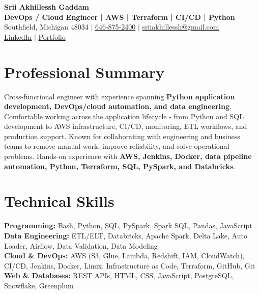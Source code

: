 \documentclass[letterpaper,10pt]{article}
\begin{document}
\fontsize{9.35pt}{10.45pt}\selectfont

\begin{center}
    {\LARGE \textbf{Srii Akhillessh Gaddam}} \\[-1pt]
    \textbf{DevOps / Cloud Engineer | AWS | Terraform | CI/CD | Python} \\[2pt]
    Southfield, Michigan 48034 $|$
    \href{tel:6468752400}{646-875-2400} $|$
    \href{mailto:sriiakhillessh@gmail.com}{sriiakhillessh@gmail.com} \\[1pt]
    \href{https://www.linkedin.com/in/srii-akhiilessh-gaddam-b48668191/}{LinkedIn} $|$
    \href{https://sriiakhillesshg.github.io/portfolio/}{Portfolio}
\end{center}
\vspace{-8pt}

\section{Professional Summary}
\small{Cross-functional engineer with experience spanning \textbf{Python application development, DevOps/cloud automation, and data engineering}. Comfortable working across the application lifecycle - from Python and SQL development to AWS infrastructure, CI/CD, monitoring, ETL workflows, and production support. Known for collaborating with engineering and business teams to remove manual work, improve reliability, and solve operational problems. Hands-on experience with \textbf{AWS, Jenkins, Docker, data pipeline automation, Python, Terraform, SQL, PySpark, and Databricks}.}

\section{Technical Skills}
\small{
\textbf{Programming:} Bash, Python, SQL, PySpark, Spark SQL, Pandas, JavaScript \\
\textbf{Data Engineering:} ETL/ELT, Databricks, Apache Spark, Delta Lake, Auto Loader, Airflow, Data Validation, Data Modeling \\
\textbf{Cloud \& DevOps:} AWS (S3, Glue, Lambda, Redshift, IAM, CloudWatch), CI/CD, Jenkins, Docker, Linux, Infrastructure as Code, Terraform, GitHub, Git \\
\textbf{Web \& Databases:} REST APIs, HTML, CSS, JavaScript, PostgreSQL, Snowflake, Greenplum
}
\end{document}
